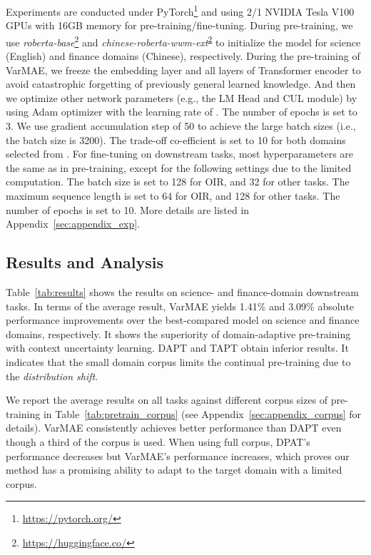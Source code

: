 \documentclass[11pt]{article}
\begin{document}
Experiments are conducted under PyTorch\footnote{\url{https://pytorch.org/}} and using 2/1 NVIDIA Tesla V100 GPUs with 16GB memory for pre-training/fine-tuning. 
During pre-training, we use 
\textit{roberta-base}\footnote{ \url{https://huggingface.co/}\label{code}} and
\textit{chinese-roberta-wwm-ext}\textsuperscript{\ref{code}} to initialize the model for science (English) and finance domains (Chinese), respectively.
During the pre-training of VarMAE, we freeze the embedding layer and all layers of Transformer encoder to avoid catastrophic forgetting \cite{DBLP:conf/nips/French93,DBLP:conf/emnlp/ArumaeSB20} of previously general learned knowledge. And then we optimize other network parameters (e.g., the LM Head and CUL module) by using Adam optimizer \cite{DBLP:journals/corr/KingmaB14} with the learning rate of . 
The number of epochs is set to 3.
We use gradient accumulation step of 50 to achieve the large batch sizes (i.e., the batch size is 3200). The trade-off co-efficient  is set to 10 for both domains selected from .
For fine-tuning on downstream tasks, most hyperparameters are the same as in pre-training,  except for the following settings due to the limited computation. The batch size is set to 128 for OIR, and 32 for other tasks.
The maximum sequence length is set to 64 for OIR, and 128 for other tasks.
The number of epochs is set to 10.
More details are listed in Appendix~\ref{sec:appendix_exp}.






\subsection{Results and Analysis}
Table~\ref{tab:results} shows the results on science- and finance-domain downstream tasks.
In terms of the average result, VarMAE yields 1.41\% and 3.09\% absolute performance improvements over the best-compared model on science and finance domains, respectively. 
It shows the superiority of domain-adaptive pre-training with context uncertainty learning.
DAPT and TAPT obtain inferior results. 
It indicates that the small domain corpus limits the continual pre-training due to
the \textit{distribution shift}.




We report the average results on all tasks against different corpus sizes of pre-training in Table~\ref{tab:pretrain_corpus}  {(see Appendix~\ref{sec:appendix_corpus} for details)}. 
VarMAE consistently achieves better performance than DAPT even though a third of the corpus is used.
When using full corpus, DPAT's performance decreases but VarMAE's performance increases, which proves our method has a promising ability to adapt to the target domain with a limited corpus.
\end{document}
